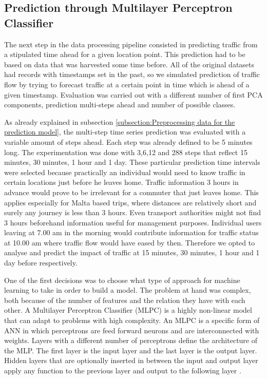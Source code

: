 \documentclass[12pt, a4paper]{report}
\theoremstyle{definition}
\theoremstyle{definition}%
\theoremstyle{definition}%
\theoremstyle{definition}%
\theoremstyle{definition}%
\theoremstyle{definition}%
\begin{document}
\subsection{Prediction through Multilayer Perceptron Classifier}


The next step in the data processing pipeline consisted in predicting traffic from a stipulated time ahead for a given location point. This prediction had to be based on data that was harvested some time before. All of the original datasets had records with timestamps set in the past, so we simulated prediction of traffic flow by trying to forecast traffic at a certain point in time which is ahead of a given timestamp. Evaluation was carried out with a different number of first PCA components, prediction multi-steps ahead and number of possible classes.

As already explained in subsection \ref{subsection:Preprocessing data for the prediction model}, the multi-step time series prediction was evaluated with a variable amount of steps ahead. Each step was already defined to be 5 minutes long. The experimentation was done with 3,6,12 and 288 steps that reflect 15 minutes, 30 minutes, 1 hour and 1 day. These particular prediction time intervals were selected because practically an individual would need to know traffic in certain locations just before he leaves home. Traffic information 3 hours in advance would prove to be irrelevant for a commuter that just leaves home. This applies especially for Malta based trips, where distances are relatively short and surely any journey is less than 3 hours. Even transport authorities might not find 3 hours beforehand information useful for management purposes. Individual users leaving at 7.00 am in the morning would contribute information for traffic status at 10.00 am where traffic flow would have eased by then. Therefore we opted to analyse and predict the impact of traffic at 15 minutes, 30 minutes, 1 hour and 1 day before respectively.

One of the first decisions was to choose what type of approach for machine learning to take in order to build a model. The problem at hand was complex, both because of the number of features and the relation they have with each other. A Multilayer Perceptron Classifier (MLPC) is a highly non-linear model that can adapt to problems with high complexity. An MLPC is a specific form of ANN in which perceptrons are feed forward neurons and are interconnected with weights. Layers with a different number of perceptrons define the architecture of the MLP. The first layer is the input layer and the last layer is the output layer. Hidden layers that are optionally inserted in between the input and output layer apply any function to the previous layer and output to the following layer \cite{Jain1996}.
\end{document}
